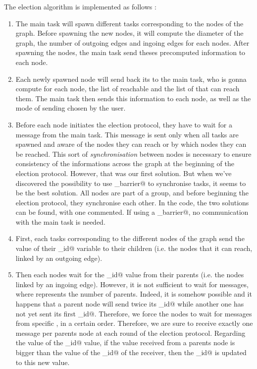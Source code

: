 \documentclass{article}
\begin{document}
The election algorithm is implemented as follows : 
\begin{enumerate}
\item The main task will spawn different \verb@pvm@ tasks corresponding to the nodes of the graph. Before spawning the new nodes, it will compute the diameter of the graph, the number of outgoing edges and ingoing edges for each nodes. After spawning the nodes, the main task send theses precomputed information to each node.
\item Each newly spawned node will send back its \verb@tid@ to the main task, who is gonna compute for each node, the list of reachable \verb@tids@ and the list of \verb@tids@ that can reach them. The main task then sends this information to each node, as well as the mode of sending chosen by the user.
\item Before each node initiates the election protocol, they have to wait for a \verb@start@ message from the main task. This message is sent only when all tasks are spawned and aware of the nodes they can reach or by which nodes they can be reached. This sort of \textit{synchronisation} between nodes is necessary to ensure consistency of the informations across the graph at the beginning of the election protocol. However, that was our first solution. But when we've discovered the possibility to use \verb@pvm_barrier@ to synchronise tasks, it seems to be the best solution. All nodes are part of a group, and before beginning the election protocol, they synchronise each other. In the code, the two solutions can be found, with one commented. If using a \verb@pvm_barrier@, no communication with the main task is needed.
\item First, each \verb@pvm@ tasks corresponding to the different nodes of the graph send the value of their \verb@max_id@ variable to their children (i.e. the nodes that it can reach, linked by an outgoing edge).
\item Then each nodes wait for the \verb@max_id@ value from their parents (i.e. the nodes linked by an ingoing edge). However, it is not sufficient to wait for \verb@n@ messages, where \verb@n@ represents the number of parents. Indeed, it is somehow possible and it happens that a parent node will send twice its \verb@max_id@ while another one has not yet sent its first \verb@max_id@. Therefore, we force the nodes to wait for messages from specific \verb@tid@, in a certain order. Therefore, we are sure to receive exactly one message per parents node at each round of the election protocol. Regarding the value of the \verb@max_id@ value, if the value received from a parents node is bigger than the value of the \verb@max_id@ of the receiver, then the \verb@max_id@ is updated to this new value.

\end{enumerate}
\end{document}
